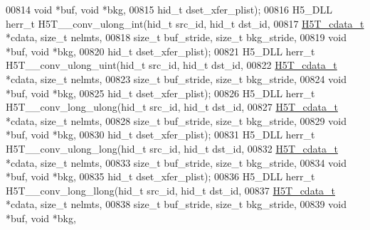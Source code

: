 \begin{DoxyCode}
00814                                   \textcolor{keywordtype}{void} *buf, \textcolor{keywordtype}{void} *bkg,
00815                                   hid\_t dset\_xfer\_plist);
00816 H5\_DLL herr\_t H5T\_\_conv\_ulong\_int(hid\_t src\_id, hid\_t dst\_id,
00817                   \hyperlink{struct_h5_t__cdata__t}{H5T\_cdata\_t} *cdata, \textcolor{keywordtype}{size\_t} nelmts,
00818                   \textcolor{keywordtype}{size\_t} buf\_stride, \textcolor{keywordtype}{size\_t} bkg\_stride,
00819                                   \textcolor{keywordtype}{void} *buf, \textcolor{keywordtype}{void} *bkg,
00820                                   hid\_t dset\_xfer\_plist);
00821 H5\_DLL herr\_t H5T\_\_conv\_ulong\_uint(hid\_t src\_id, hid\_t dst\_id,
00822                    \hyperlink{struct_h5_t__cdata__t}{H5T\_cdata\_t} *cdata, \textcolor{keywordtype}{size\_t} nelmts,
00823                    \textcolor{keywordtype}{size\_t} buf\_stride, \textcolor{keywordtype}{size\_t} bkg\_stride,
00824                                    \textcolor{keywordtype}{void} *buf, \textcolor{keywordtype}{void} *bkg,
00825                                    hid\_t dset\_xfer\_plist);
00826 H5\_DLL herr\_t H5T\_\_conv\_long\_ulong(hid\_t src\_id, hid\_t dst\_id,
00827                    \hyperlink{struct_h5_t__cdata__t}{H5T\_cdata\_t} *cdata, \textcolor{keywordtype}{size\_t} nelmts,
00828                    \textcolor{keywordtype}{size\_t} buf\_stride, \textcolor{keywordtype}{size\_t} bkg\_stride,
00829                                    \textcolor{keywordtype}{void} *buf, \textcolor{keywordtype}{void} *bkg,
00830                                    hid\_t dset\_xfer\_plist);
00831 H5\_DLL herr\_t H5T\_\_conv\_ulong\_long(hid\_t src\_id, hid\_t dst\_id,
00832                    \hyperlink{struct_h5_t__cdata__t}{H5T\_cdata\_t} *cdata, \textcolor{keywordtype}{size\_t} nelmts,
00833                    \textcolor{keywordtype}{size\_t} buf\_stride, \textcolor{keywordtype}{size\_t} bkg\_stride,
00834                                    \textcolor{keywordtype}{void} *buf, \textcolor{keywordtype}{void} *bkg,
00835                                    hid\_t dset\_xfer\_plist);
00836 H5\_DLL herr\_t H5T\_\_conv\_long\_llong(hid\_t src\_id, hid\_t dst\_id,
00837                    \hyperlink{struct_h5_t__cdata__t}{H5T\_cdata\_t} *cdata, \textcolor{keywordtype}{size\_t} nelmts,
00838                    \textcolor{keywordtype}{size\_t} buf\_stride, \textcolor{keywordtype}{size\_t} bkg\_stride,
00839                                    \textcolor{keywordtype}{void} *buf, \textcolor{keywordtype}{void} *bkg,

\end{DoxyCode}
